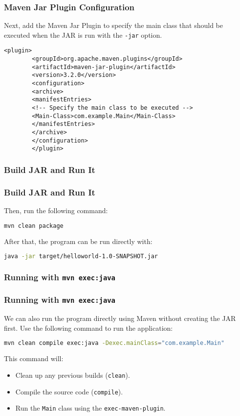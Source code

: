\documentclass[aspectratio=169, table]{beamer}
\begin{document}
\begin{frame}[fragile]
	\frametitle{Maven Jar Plugin Configuration}
	\vspace{20pt}
	Next, add the Maven Jar Plugin to specify the main class that should be executed when the JAR is run with the \texttt{-jar} option.
	\begin{lstlisting}[style=XmlStyle]
		<plugin>
		<groupId>org.apache.maven.plugins</groupId>
		<artifactId>maven-jar-plugin</artifactId>
		<version>3.2.0</version>
		<configuration>
		<archive>
		<manifestEntries>
		<!-- Specify the main class to be executed -->
		<Main-Class>com.example.Main</Main-Class>
		</manifestEntries>
		</archive>
		</configuration>
		</plugin>
	\end{lstlisting}
\end{frame}


\subsubsection{Build JAR and Run It}
\begin{frame}[fragile]
	\frametitle{Build JAR and Run It}
	Then, run the following command:
	\begin{lstlisting}[language=bash]
		mvn clean package
	\end{lstlisting}
	After that, the program can be run directly with:
	\begin{lstlisting}[language=bash]
		java -jar target/helloworld-1.0-SNAPSHOT.jar
	\end{lstlisting}
\end{frame}

\subsubsection{Running with \texttt{mvn exec:java}}
\begin{frame}[fragile]
	\frametitle{Running with \texttt{mvn exec:java}}
	We can also run the program directly using Maven without creating the JAR first.
	Use the following command to run the application:
	\begin{lstlisting}[language=bash]
		mvn clean compile exec:java -Dexec.mainClass="com.example.Main"
	\end{lstlisting}
	This command will:
	\begin{itemize}
		\item Clean up any previous builds (\texttt{clean}).
		\item Compile the source code (\texttt{compile}).
		\item Run the \texttt{Main} class using the \texttt{exec-maven-plugin}.
	\end{itemize}
\end{frame}
\end{document}
